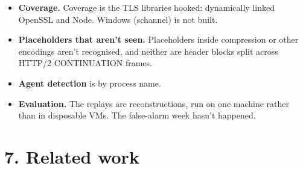 \documentclass[
  11pt]{article}
\providecommand{\tightlist}{%
  \setlength{\itemsep}{0pt}\setlength{\parskip}{0pt}}
\begin{document}
\begin{itemize}
\tightlist
\item
  \textbf{Coverage.} Coverage is the TLS
  libraries hooked: dynamically linked
  OpenSSL and Node. Windows (schannel)
  is not built.
\item
  \textbf{Placeholders that aren't
  seen.} Placeholders inside compression
  or other encodings aren't recognised,
  and neither are header blocks split
  across HTTP/2 CONTINUATION frames.
\item
  \textbf{Agent detection} is by process
  name.
\item
  \textbf{Evaluation.} The replays are
  reconstructions, run on one machine
  rather than in disposable VMs. The
  false-alarm week hasn't happened.
\end{itemize}

\section*{7. Related
work}\label{related-work}
\end{document}
